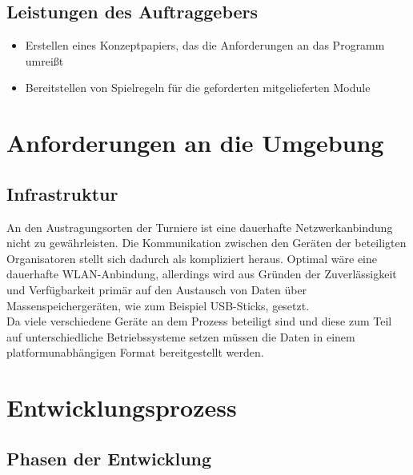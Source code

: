 \documentclass[11pt]{article}
\begin{document}
\subsection{Leistungen des Auftraggebers}

\begin{itemize}
	\item Erstellen eines Konzeptpapiers, das die Anforderungen an das Programm umreißt
	\item Bereitstellen von Spielregeln für die geforderten mitgelieferten Module
\end{itemize}

\newpage

\section{Anforderungen an die Umgebung}

\subsection{Infrastruktur}

An den Austragungsorten der Turniere ist eine dauerhafte Netzwerkanbindung nicht zu gewährleisten. Die Kommunikation zwischen den Geräten der beteiligten Organisatoren stellt sich dadurch als kompliziert heraus. Optimal wäre eine dauerhafte WLAN-Anbindung, allerdings wird aus Gründen der Zuverlässigkeit und Verfügbarkeit primär auf den Austausch von Daten über Massenspeichergeräten, wie zum Beispiel USB-Sticks, gesetzt.\\
Da viele verschiedene Geräte an dem Prozess beteiligt sind und diese zum Teil auf unterschiedliche Betriebssysteme setzen müssen die Daten in einem platformunabhängigen Format bereitgestellt werden.

\newpage

\section{Entwicklungsprozess}

\subsection{Phasen der Entwicklung}
\end{document}
